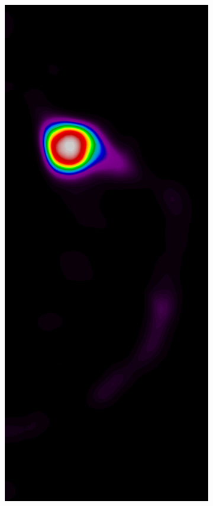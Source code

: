 \documentclass{beamer}
\begin{document}
\begin{frame}
\begin{figure}
\begin{subfigure}{0.134\textwidth}
            \end{subfigure}
            \begin{subfigure}{0.134\textwidth}
	            \centering
		            \includegraphics[width=\textwidth]{plots/examples/example2_probs_3.png}

\end{subfigure}
\end{figure}
\end{frame}
\end{document}
